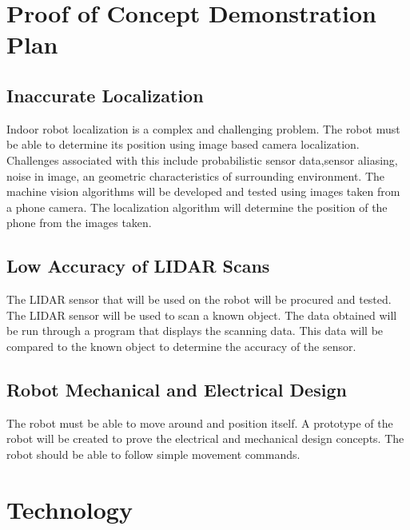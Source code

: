 \documentclass[titlepage]{article}
\begin{document}
\section{Proof of Concept Demonstration Plan}

\subsection{Inaccurate Localization}
Indoor robot localization is a complex and challenging problem.
The robot must be able to determine its position using image based camera localization. Challenges associated with this include probabilistic sensor data,sensor aliasing, noise in image, an geometric characteristics of surrounding environment. The machine vision algorithms will be developed and tested using images taken from a phone camera. The localization algorithm will determine the position of the phone from the images taken.

\subsection{Low Accuracy of LIDAR Scans}

The LIDAR sensor that will be used on the robot will be procured and tested. The LIDAR sensor will be used to scan a known object. The data obtained will be run through a program that displays the scanning data. This data will be compared to the known object to determine the accuracy of the sensor.

\subsection{Robot Mechanical and Electrical Design}

The robot must be able to move around and position itself. A prototype of the robot will be created to prove the electrical and mechanical design concepts. The robot should be able to follow simple movement commands.

\section{Technology}
\end{document}
